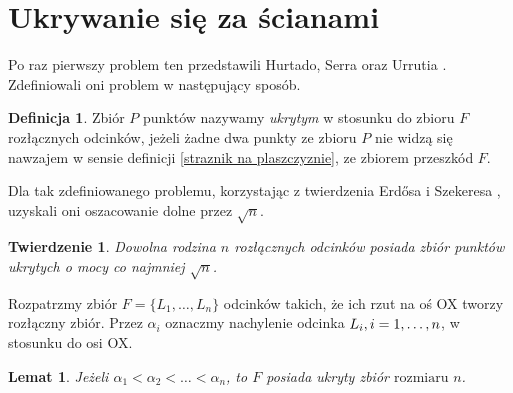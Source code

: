 \documentclass{xmgr}
\newtheorem{Twierdzenie}{Twierdzenie}
\newtheorem{Lemat}{Lemat}
\theoremstyle{definition}
\newtheorem{Definicja}{Definicja}
\begin{document}
\section{Ukrywanie się za ścianami}
Po raz pierwszy problem ten przedstawili Hurtado, Serra oraz Urrutia \cite{sciany}. Zdefiniowali oni problem w następujący sposób.

\begin{Definicja}\label{ukrywanie definicja}
 Zbiór $P$ punktów nazywamy \emph{ukrytym} w stosunku do zbioru $F$ rozłącznych odcinków, jeżeli żadne dwa punkty ze zbioru $P$ nie widzą się nawzajem w sensie definicji \ref{straznik na plaszczyznie}, ze zbiorem przeszkód $F$.
\end{Definicja}

Dla tak zdefiniowanego problemu, korzystając z twierdzenia Erd{\H o}sa i Szekeresa \cite{erdosszekeres}, uzyskali oni oszacowanie dolne przez $\sqrt{n}$.

\begin{Twierdzenie}\label{moc zbioru ukrytego tw} \cite{illumination}
  Dowolna rodzina $n$ rozłącznych odcinków posiada zbiór punktów ukrytych o mocy co najmniej $\sqrt{n}$.
\end{Twierdzenie}

Rozpatrzmy zbiór $F = \{L_1,\ldots,L_n\}$ odcinków takich, że ich rzut na oś OX tworzy rozłączny zbiór. Przez $\alpha_i$ oznaczmy nachylenie odcinka $L_i, \linebreak i = 1,\ldots,n$, w stosunku do osi OX.
\begin{Lemat}\label{zbior ukryty} \cite{illumination}
  Jeżeli $\alpha_1 < \alpha_2 < \ldots < \alpha_n$, to $F$ posiada ukryty zbiór $\mbox{rozmiaru $n$}$.
\end{Lemat}
\end{document}

